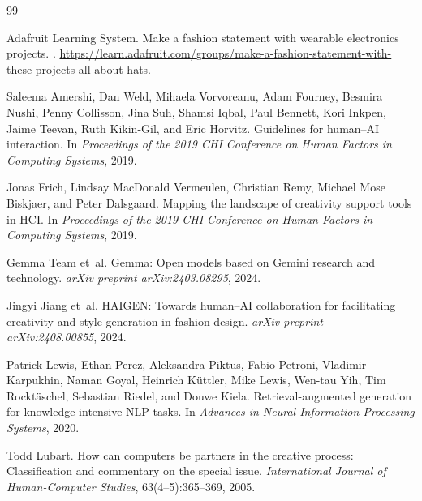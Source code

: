 \documentclass{article}
\begin{document}
{\small

\begin{thebibliography}{99}

Adafruit Learning System.
\newblock Make a fashion statement with wearable electronics projects.
.
\newblock
\url{https://learn.adafruit.com/groups/make-a-fashion-statement-with-these-projects-all-about-hats}.

Saleema Amershi, Dan Weld, Mihaela Vorvoreanu, Adam Fourney, Besmira Nushi,
Penny Collisson, Jina Suh, Shamsi Iqbal, Paul Bennett, Kori Inkpen,
Jaime Teevan, Ruth Kikin-Gil, and Eric Horvitz.
\newblock Guidelines for human--AI interaction.
\newblock In \emph{Proceedings of the 2019 CHI Conference on Human Factors in
Computing Systems}, 2019.

Jonas Frich, Lindsay MacDonald Vermeulen, Christian Remy,
Michael Mose Biskjaer, and Peter Dalsgaard.
\newblock Mapping the landscape of creativity support tools in HCI.
\newblock In \emph{Proceedings of the 2019 CHI Conference on Human Factors in
Computing Systems}, 2019.

Gemma Team et~al.
\newblock Gemma: Open models based on Gemini research and technology.
\newblock \emph{arXiv preprint arXiv:2403.08295}, 2024.

Jingyi Jiang et~al.
\newblock HAIGEN: Towards human--AI collaboration for facilitating creativity
and style generation in fashion design.
\newblock \emph{arXiv preprint arXiv:2408.00855}, 2024.

Patrick Lewis, Ethan Perez, Aleksandra Piktus, Fabio Petroni,
Vladimir Karpukhin, Naman Goyal, Heinrich K{\"u}ttler, Mike Lewis,
Wen-tau Yih, Tim Rockt{\"a}schel, Sebastian Riedel, and Douwe Kiela.
\newblock Retrieval-augmented generation for knowledge-intensive NLP tasks.
\newblock In \emph{Advances in Neural Information Processing Systems}, 2020.

Todd Lubart.
\newblock How can computers be partners in the creative process:
Classification and commentary on the special issue.
\newblock \emph{International Journal of Human-Computer Studies},
63(4--5):365--369, 2005.


\end{thebibliography}}
\end{document}
